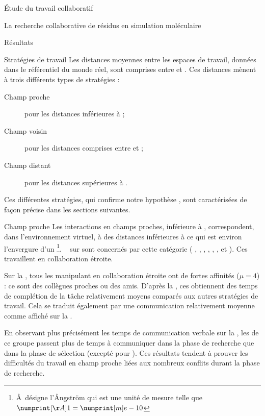 \documentclass[myfrancais]{mythesis}
\begin{document}
\begin{mypart}{Étude du travail collaboratif}
\begin{mychapter}{La recherche collaborative de résidus en simulation moléculaire}
\begin{mysection}{Résultats}
\begin{mysubsection}{Stratégies de travail}
					Les distances moyennes entre les espaces de travail, données dans le référentiel du monde réel, sont comprises entre  et .
					Ces distances mènent à trois différents types de stratégies :
					\begin{description}
						\item[Champ proche] pour les distances inférieures à ;
						\item[Champ voisin] pour les distances comprises entre  et ;
						\item[Champ distant] pour les distances supérieures à .
					\end{description}

					Ces différentes stratégies, qui confirme notre hypothèse , sont caractérisées de façon précise dans les sections suivantes.

					\begin{mysubsubsection}{Champ proche}
						Les interactions en champs proches, inférieure à , correspondent, dans l'environnement virtuel, à des distances inférieures à  ce qui est environ l'envergure d'un \footnote{\AA\ désigne l'\AA ngström qui est une unité de mesure telle que $\mynum[\AA]{1} = \mynum[m]{e-10}$}.
						~ sur  sont concernés par cette catégorie ( , , , , , ,  et ).
						Ces  travaillent en collaboration étroite.

						Sur la , tous les  manipulant en collaboration étroite ont de fortes affinités ($\mu = 4$) : ce sont des collègues proches ou des amis.
						D'après la , ces  obtiennent des temps de complétion de la tâche relativement moyens comparés aux autres stratégies de travail.
						Cela se traduit également par une communication relativement moyenne comme affiché sur la .

						En observant plus précisément les temps de communication verbale sur la , les  de ce groupe passent plus de temps à communiquer dans la phase de recherche que dans la phase de sélection (excepté pour ).
						Ces résultats tendent à prouver les difficultés du travail en champ proche liées aux nombreux conflits durant la phase de recherche.


\end{mysubsubsection}
\end{mysubsection}
\end{mysection}
\end{mychapter}
\end{mypart}
\end{document}
